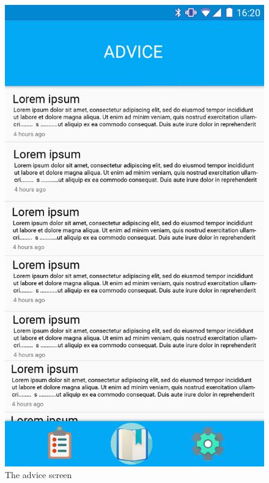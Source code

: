 \begin{figure}
\centering
\begin{minipage}{.5\textwidth}
  \centering
  \includegraphics[width=0.9\linewidth]{../images/UI/Advice.png}
  \caption{\label{fig:advice}The advice screen}


\end{minipage}
\end{figure}
